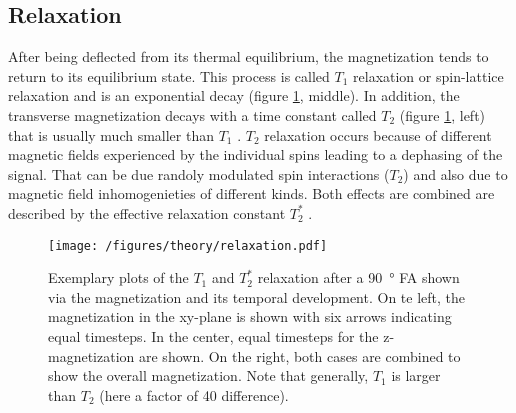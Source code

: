        \subsection{Relaxation}
        \label{chapter:theory:relaxation}
        After being deflected from its thermal equilibrium, the magnetization tends to return to its equilibrium state. This process is called $T_1$ relaxation or spin-lattice relaxation and is an exponential decay (figure \ref{theory:figure:relaxation}, middle). In addition, the transverse magnetization decays with a time constant called $T_2$ (figure \ref{theory:figure:relaxation}, left) that is usually much smaller than $T_1$ \cite{levitt_spin_nodate}. $T_2$ relaxation occurs because of different magnetic fields experienced by the individual spins leading to a dephasing of the signal. That can be due randoly modulated spin interactions ($T_2$) and also due to magnetic field inhomogenieties of different kinds. Both effects are combined are described by the effective relaxation constant $T_2^*$ \cite{chavhan_principles_2009}.
            \begin{figure}
                \centering
                \texttt{[image: /figures/theory/relaxation.pdf]}
                \caption[Relaxation in NMR]{Exemplary plots of the $T_1$ and $T_2^*$ relaxation after a \SI{90}{\degree} FA shown via the magnetization and its temporal development. On te left, the magnetization in the xy-plane is shown with six arrows indicating equal timesteps. In the center, equal timesteps for the z-magnetization are shown. On the right, both cases are combined to show the overall magnetization. Note that generally, $T_1$ is larger than $T_2$ (here a factor of 40 difference).}
                \label{theory:figure:relaxation}
            \end{figure}
